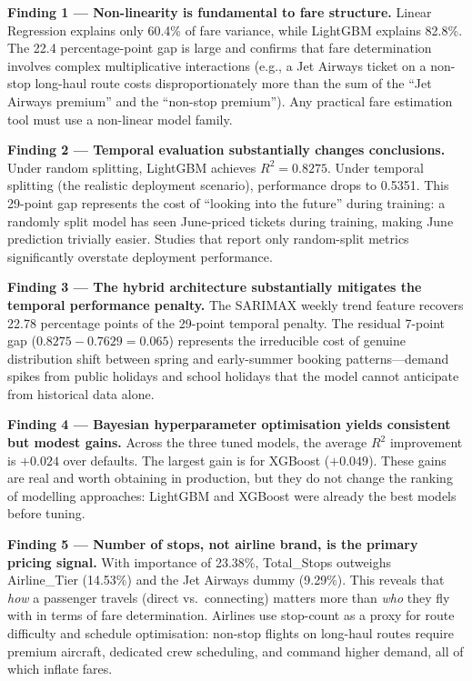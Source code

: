 \documentclass[12pt, a4paper]{article}
\begin{document}
\textbf{Finding 1 --- Non-linearity is fundamental to fare structure.}
Linear Regression explains only 60.4\% of fare variance, while LightGBM
explains 82.8\%.  The 22.4 percentage-point gap is large and confirms that
fare determination involves complex multiplicative interactions (e.g., a
Jet Airways ticket on a non-stop long-haul route costs disproportionately
more than the sum of the ``Jet Airways premium'' and the ``non-stop premium'').
Any practical fare estimation tool must use a non-linear model family.

\textbf{Finding 2 --- Temporal evaluation substantially changes conclusions.}
Under random splitting, LightGBM achieves $R^2 = 0.8275$.  Under temporal
splitting (the realistic deployment scenario), performance drops to 0.5351.
This 29-point gap represents the cost of ``looking into the future'' during
training: a randomly split model has seen June-priced tickets during
training, making June prediction trivially easier.  Studies that report
only random-split metrics significantly overstate deployment performance.

\textbf{Finding 3 --- The hybrid architecture substantially mitigates the
temporal performance penalty.}  The SARIMAX weekly trend feature recovers
22.78 percentage points of the 29-point temporal penalty.  The residual
7-point gap ($0.8275 - 0.7629 = 0.065$) represents the irreducible cost
of genuine distribution shift between spring and early-summer booking
patterns---demand spikes from public holidays and school holidays that the
model cannot anticipate from historical data alone.

\textbf{Finding 4 --- Bayesian hyperparameter optimisation yields consistent
but modest gains.}  Across the three tuned models, the average $R^2$
improvement is $+0.024$ over defaults.  The largest gain is for XGBoost
($+0.049$).  These gains are real and worth obtaining in production, but
they do not change the ranking of modelling approaches: LightGBM and
XGBoost were already the best models before tuning.

\textbf{Finding 5 --- Number of stops, not airline brand, is the primary
pricing signal.}  With importance of 23.38\%, Total\_Stops outweighs
Airline\_Tier (14.53\%) and the Jet Airways dummy (9.29\%).  This reveals
that \textit{how} a passenger travels (direct vs.\ connecting) matters more
than \textit{who} they fly with in terms of fare determination.  Airlines
use stop-count as a proxy for route difficulty and schedule optimisation:
non-stop flights on long-haul routes require premium aircraft, dedicated
crew scheduling, and command higher demand, all of which inflate fares.
\end{document}
